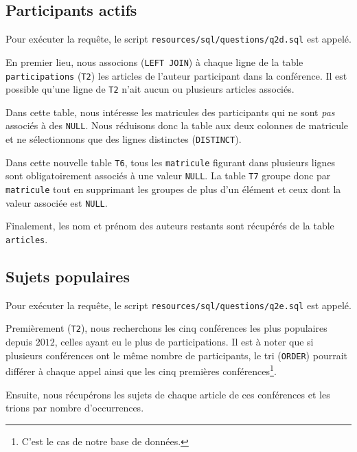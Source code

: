 \documentclass[a4paper, 12pt]{article}
\begin{document}
    \subsection{Participants actifs}
    Pour exécuter la requête, le script \texttt{resources/sql/questions/q2d.sql} est appelé.
    
    En premier lieu, nous associons (\texttt{LEFT JOIN}) à chaque ligne de la table \texttt{participations} (\texttt{T2}) les articles de l'auteur participant dans la conférence. Il est possible qu'une ligne de \texttt{T2} n'ait aucun ou plusieurs articles associés. \par
    Dans cette table, nous intéresse les matricules des participants qui ne sont \emph{pas} associés à des \texttt{NULL}. Nous réduisons donc la table aux deux colonnes de matricule et ne sélectionnons que des lignes distinctes (\texttt{DISTINCT}). \par
    Dans cette nouvelle table \texttt{T6}, tous les \texttt{matricule} figurant dans plusieurs lignes sont obligatoirement associés à une valeur \texttt{NULL}. La table \texttt{T7} groupe donc par \texttt{matricule} tout en supprimant les groupes de plus d'un élément et ceux dont la valeur associée est \texttt{NULL}. \par
    Finalement, les nom et prénom des auteurs restants sont récupérés de la table \texttt{articles}.
    \newpage
    \subsection{Sujets populaires}
    Pour exécuter la requête, le script \texttt{resources/sql/questions/q2e.sql} est appelé.
    
    Premièrement (\texttt{T2}), nous recherchons les cinq conférences les plus populaires depuis $2012$, \cad{} celles ayant eu le plus de participations. Il est à noter que si plusieurs conférences ont le même nombre de participants, le tri (\texttt{ORDER}) pourrait différer à chaque appel ainsi que les cinq premières conférences\footnote{C'est le cas de notre base de données.}. \par
    Ensuite, nous récupérons les sujets de chaque article de ces conférences et les trions par nombre d'occurrences.
\end{document}
